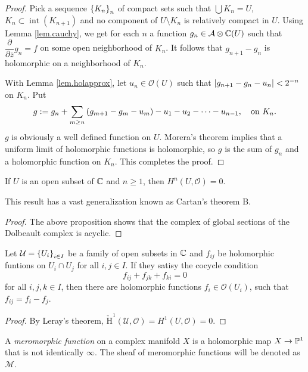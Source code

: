 \documentclass{article}
\newcommand{\cH}{\check{\mathrm{H}}}
\begin{document}
\begin{proof}
    Pick a sequence $\bc{K_n}_n$ of compact sets such that $\bigcup K_n=U$, $K_n\subset\operatorname{int}(K_{n+1})$ and no component of $U\setminus K_n$ is relatively compact in $U$. Using Lemma \ref{lem.cauchy}, we get for each $n$ a function $g_n\in\mathcal{A}\otimes\C(U)$ such that $\dfrac{\partial}{\partial\overline{z}}g_n=f$ on some open neighborhood of $K_n$. It follows that $g_{n+1}-g_{n}$ is holomorphic on a neighborhood of $K_n$.

    With Lemma \ref{lem.holapprox}, let $u_n\in\mathcal{O}(U)$ such that $\abs{g_{n+1}-g_{n}-u_{n}}<2^{-n}$ on $K_n$. Put
    \[
        g := g_n + \sum_{m\geq n} \bp{g_{m+1}-g_{m}-u_{m}} - u_1 - u_2 - \cdots - u_{n-1},\quad\text{on }K_n.
    \]
    $g$ is obviously a well defined function on $U$. Morera's theorem implies that a uniform limit of holomorphic functions is holomorphic, so $g$ is the sum of $g_n$ and a holomorphic function on $K_n$. This completes the proof.
\end{proof}

\begin{theorem}
    If $U$ is an open subset of $\C$ and $n\geq 1$, then $H^{n}(U,\mathcal{O})=0$.
\end{theorem}

\begin{remark}
    This result has a vast generalization known as Cartan's theorem B.
\end{remark}

\begin{proof}
    The above proposition shows that the complex of global sections of the Dolbeault complex is acyclic.
\end{proof}

\begin{corollary}
    Let $\mathcal{U}=\bc{U_i}_{i\in I}$ be a family of open subsets in $\C$ and $f_{ij}$ be holomorphic funtions on $U_i\cap U_j$ for all $i,j\in I$. If they satisy the cocycle condition
    \[
        f_{ij}+f_{jk}+f_{ki}=0
    \]
    for all $i,j,k\in I$, then there are holomorphic functions $f_i\in\mathcal{O}(U_i)$, such that $f_{ij}=f_i-f_j$.
\end{corollary}

\begin{proof}
    By Leray's theorem, $\cH^{1}(\mathcal{U},\mathcal{O})=H^{1}(U,\mathcal{O})=0$.
\end{proof}

\begin{definition}
    A \emph{meromorphic function} on a complex manifold $X$ is a holomorphic map $X\to\P^1$ that is not identically $\infty$. The sheaf of meromorphic functions will be denoted as $\mathcal{M}$.
\end{definition}
\end{document}
